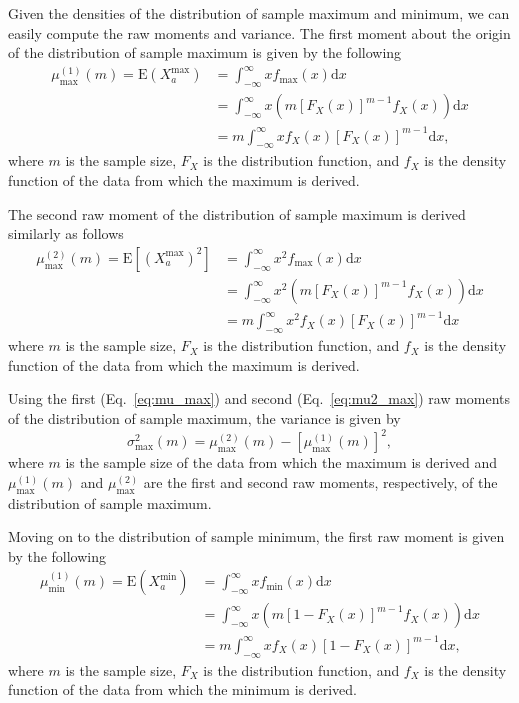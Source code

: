 \documentclass[aos]{imsart}
\begin{document}
Given the densities of the distribution of sample maximum and minimum, we can easily compute the raw moments and variance. The first moment about the origin of the distribution of sample maximum is given by the following
%
\begin{equation}\label{eq:mu_max}
\begin{aligned}
\mu^{(1)}_\text{max}(m) = \text{E}(X^\text{max}_a) &= \int_{-\infty}^{\infty}x f_\text{max}(x)\text{d}x \\
&= \int_{-\infty}^{\infty}x \left(m [F_X(x)]^{m-1} f_X(x)\right)\text{d}x \\
&= m \int_{-\infty}^{\infty}x f_X(x) [F_X(x)]^{m-1}\text{d}x,
\end{aligned}
\end{equation}
%
where $m$ is the sample size, $F_X$ is the distribution function, and $f_X$ is the density function of the data from which the maximum is derived.

The second raw moment of the distribution of sample maximum is derived similarly as follows
%
\begin{equation}\label{eq:mu2_max}
\begin{aligned}
\mu^{(2)}_\text{max}(m) = \text{E}[(X^\text{max}_a)^2] &= \int_{-\infty}^{\infty}x^2 f_\text{max}(x)\text{d}x \\
&= \int_{-\infty}^{\infty}x^2 \left(m [F_X(x)]^{m-1} f_X(x)\right)\text{d}x \\
&= m \int_{-\infty}^{\infty}x^2 f_X(x) [F_X(x)]^{m-1}\text{d}x
\end{aligned}
\end{equation}
%
where $m$ is the sample size, $F_X$ is the distribution function, and $f_X$ is the density function of the data from which the maximum is derived.

Using the first (Eq.~\ref{eq:mu_max}) and second (Eq.~\ref{eq:mu2_max}) raw moments of the distribution of sample maximum, the variance is given by
\begin{equation}\label{eq:sig_max}
\sigma^2_\text{max}(m) = \mu^{(2)}_\text{max}(m) - \left[\mu^{(1)}_\text{max}(m)\right]^2,
\end{equation}
%
where $m$ is the sample size of the data from which the maximum is derived and $\mu^{(1)}_\text{max}(m)$ and $\mu^{(2)}_\text{max}$ are the first and second raw moments, respectively, of the distribution of sample maximum.

Moving on to the distribution of sample minimum, the first raw moment is given by the following
%
\begin{equation}\label{eq:mu_min}
\begin{aligned}
\mu^{(1)}_\text{min}(m) = \text{E}(X^\text{min}_a) &= \int_{-\infty}^{\infty}x f_\text{min}(x)\text{d}x \\
&= \int_{-\infty}^{\infty}x \left(m [1 - F_X(x)]^{m-1} f_X(x)\right)\text{d}x \\
&= m \int_{-\infty}^{\infty}x f_X(x) [1 - F_X(x)]^{m-1}\text{d}x,
\end{aligned}
\end{equation}
%
where $m$ is the sample size, $F_X$ is the distribution function, and $f_X$ is the density function of the data from which the minimum is derived.
\end{document}

